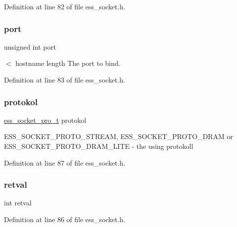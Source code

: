 Definition at line 82 of file ess\+\_\+socket.\+h.

\mbox{\label{structess__socket_a938bdc6ae46c346147b6d4f67ad1e704}} 
\subsubsection{\texorpdfstring{port}{port}}
{\footnotesize\ttfamily unsigned int port}

$<$ hostname length The port to bind. 

Definition at line 83 of file ess\+\_\+socket.\+h.

\mbox{\label{structess__socket_a1f0429596710512357072b192ba3d2bd}} 
\subsubsection{\texorpdfstring{protokol}{protokol}}
{\footnotesize\ttfamily \hyperlink{ess__socket_8h_a1e8e8de805f8e0b7da25e3b177977273}{ess\+\_\+socket\+\_\+pro\+\_\+t} protokol}

{\ttfamily E\+S\+S\+\_\+\+S\+O\+C\+K\+E\+T\+\_\+\+P\+R\+O\+T\+O\+\_\+\+S\+T\+R\+E\+AM}, {\ttfamily E\+S\+S\+\_\+\+S\+O\+C\+K\+E\+T\+\_\+\+P\+R\+O\+T\+O\+\_\+\+D\+R\+AM} or {\ttfamily E\+S\+S\+\_\+\+S\+O\+C\+K\+E\+T\+\_\+\+P\+R\+O\+T\+O\+\_\+\+D\+R\+A\+M\+\_\+\+L\+I\+TE} -\/ the using protokoll 

Definition at line 87 of file ess\+\_\+socket.\+h.

\mbox{\label{structess__socket_a7f345697df7eb20c9aba1ab6980cae8f}} 
\subsubsection{\texorpdfstring{retval}{retval}}
{\footnotesize\ttfamily int retval}



Definition at line 86 of file ess\+\_\+socket.\+h.

\mbox{\label{structess__socket_a3666576f6b88007cc7b8f26c7da596c8}} 
